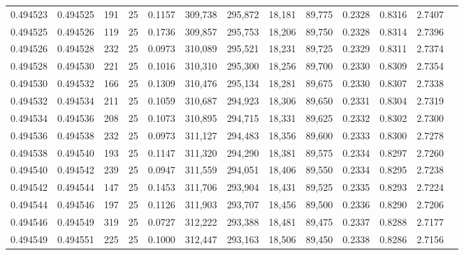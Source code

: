 \begin{tabular}{rrrrrrrrrrrrr}
0.494523 & 0.494525 &   191 &  25 &                                     0.1157 & 309,738 & 295,872 &  18,181 &  89,775 & 0.2328 & 0.8316 & 2.7407 \\
0.494525 & 0.494526 &   119 &  25 &                                     0.1736 & 309,857 & 295,753 &  18,206 &  89,750 & 0.2328 & 0.8314 & 2.7396 \\
0.494526 & 0.494528 &   232 &  25 &                                     0.0973 & 310,089 & 295,521 &  18,231 &  89,725 & 0.2329 & 0.8311 & 2.7374 \\
0.494528 & 0.494530 &   221 &  25 &                                     0.1016 & 310,310 & 295,300 &  18,256 &  89,700 & 0.2330 & 0.8309 & 2.7354 \\
0.494530 & 0.494532 &   166 &  25 &                                     0.1309 & 310,476 & 295,134 &  18,281 &  89,675 & 0.2330 & 0.8307 & 2.7338 \\
0.494532 & 0.494534 &   211 &  25 &                                     0.1059 & 310,687 & 294,923 &  18,306 &  89,650 & 0.2331 & 0.8304 & 2.7319 \\
0.494534 & 0.494536 &   208 &  25 &                                     0.1073 & 310,895 & 294,715 &  18,331 &  89,625 & 0.2332 & 0.8302 & 2.7300 \\
0.494536 & 0.494538 &   232 &  25 &                                     0.0973 & 311,127 & 294,483 &  18,356 &  89,600 & 0.2333 & 0.8300 & 2.7278 \\
0.494538 & 0.494540 &   193 &  25 &                                     0.1147 & 311,320 & 294,290 &  18,381 &  89,575 & 0.2334 & 0.8297 & 2.7260 \\
0.494540 & 0.494542 &   239 &  25 &                                     0.0947 & 311,559 & 294,051 &  18,406 &  89,550 & 0.2334 & 0.8295 & 2.7238 \\
0.494542 & 0.494544 &   147 &  25 &                                     0.1453 & 311,706 & 293,904 &  18,431 &  89,525 & 0.2335 & 0.8293 & 2.7224 \\
0.494544 & 0.494546 &   197 &  25 &                                     0.1126 & 311,903 & 293,707 &  18,456 &  89,500 & 0.2336 & 0.8290 & 2.7206 \\
0.494546 & 0.494549 &   319 &  25 &                                     0.0727 & 312,222 & 293,388 &  18,481 &  89,475 & 0.2337 & 0.8288 & 2.7177 \\
0.494549 & 0.494551 &   225 &  25 &                                     0.1000 & 312,447 & 293,163 &  18,506 &  89,450 & 0.2338 & 0.8286 & 2.7156 \\

\end{tabular}
